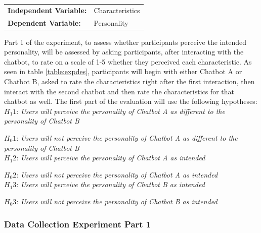 \begin{tabular}{ l l }
    \textbf{Independent Variable:} & Characteristics \\ 
    \textbf{Dependent Variable:} & Personality \\  
\end{tabular}

\vspace{2,5mm}

Part 1 of the experiment, to assess whether participants perceive the intended personality, will be assessed by asking participants, after interacting with the chatbot, to rate on a scale of 1-5 whether they perceived each characteristic. As seen in table \ref{table:expdes}, participants will begin with either Chatbot A or Chatbot B, asked to rate the characteristics right after the first interaction, then interact with the second chatbot and then rate the characteristics for that chatbot as well. The first part of the evaluation will use the following hypotheses:\\
    
    $H_1 1$: \textit{Users will perceive the personality of Chatbot A as different to the personality of Chatbot B}
    
    $H_0 1$: \textit{Users will not perceive the personality of Chatbot A as different to the personality of Chatbot B} \\
  
    $H_1 2$: \textit{Users will perceive the personality of Chatbot A as intended} 
    
    $H_0 2$: \textit{Users will not perceive the personality of Chatbot A as intended}\\
   
    $H_1 3$: \textit{Users will perceive the personality of Chatbot B as intended}
   
    $H_0 3$: \textit{Users will not perceive the personality of Chatbot B as intended}\\
    

\subsubsection{Data Collection Experiment Part 1}

